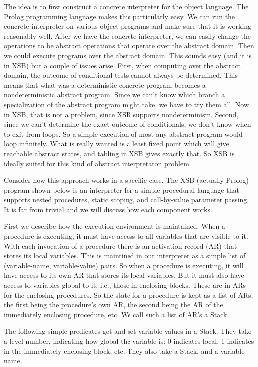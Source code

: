 The idea is to first construct a concrete interpreter for the object
language.  The Prolog programming language makes this particularly
easy.  We can run the concrete interpreter on various object programs
and make sure that it is working reasonably well.  After we have the
concrete interpreter, we can easily change the operations to be
abstract operations that operate over the abstract domain.  Then we
could execute programs over the abstract domain.  This sounds easy
(and it is in XSB) but a couple of issues arise.  First, when
computing over the abstract domain, the outcome of conditional tests
cannot always be determined.  This means that what was a
deterministic concrete program becomes a nondeterministic abstract
program.  Since we can't know which branch a specialization of the
abstract program might take, we have to try them all.  Now in XSB,
that is not a problem, since XSB supports nondeterminism.  Second,
since we can't determine the exact outcome of conditionals, we don't
know when to exit from loops.  So a simple execution of most any
abstract program would loop infinitely.  What is really wanted is a
least fixed point which will give reachable abstract states, and
tabling in XSB gives exactly that.  So XSB is ideally suited for this
kind of abstract interpretaton problem.

Consider how this approach works in a specific case.  The XSB
(actually Prolog) program shown below is an interpreter for a simple
procedural language that supports nested procedures, static scoping,
and call-by-value parameter passing.  It is far from trivial and we
will discuss how each component works.

First we describe how the execution environment is maintained.  When a
procedure is executing, it must have access to all variables that are
visible to it.  With each invocation of a procedure there is an
activation record (AR) that stores its local variables.  This is
maintined in our interpreter as a simple list of (variable-name,
variable-value) pairs.  So when a procedure is executing, it will have
access to its own AR that stores its local variables.  But it must
also have access to variables global to it, i.e., those in enclosing
blocks.  These are in ARs for the enclosing procedures.  So the state
for a procedure is kept as a list of ARs, the first being the
procedure's own AR, the second being the AR of the immediately
enclosing procedure, etc.  We call such a list of AR's a Stack.

The following simple predicates get and set variable values in a
Stack.  They take a level number, indicating how global the variable
is: 0 indicates local, 1 indicates in the immediately enclosing block,
etc.  They also take a Stack, and a variable name.

